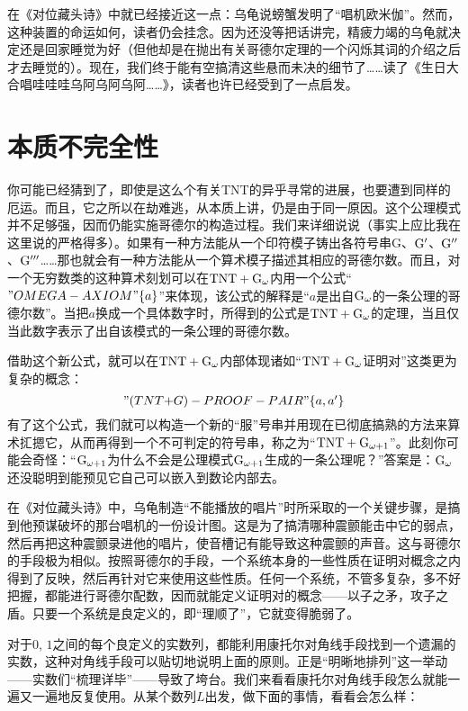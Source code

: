 在《对位藏头诗》中就已经接近这一点：乌龟说螃蟹发明了“唱机欧米伽”。然而，这种装置的命运如何，读者仍会挂念。因为还没等把话讲完，精疲力竭的乌龟就决定还是回家睡觉为好（但他却是在抛出有关哥德尔定理的一个闪烁其词的介绍之后才去睡觉的）。现在，我们终于能有空搞清这些悬而未决的细节了……读了《生日大合唱哇哇哇乌阿乌阿乌阿……》，读者也许已经受到了一点启发。

\section{本质不完全性}

你可能已经猜到了，即使是这么个有关TNT的异乎寻常的进展，也要遭到同样的厄运。而且，它之所以在劫难逃，从本质上讲，仍是由于同一原因。这个公理模式并不足够强，因而仍能实施哥德尔的构造过程。我们来详细说说（事实上应比我在这里说的严格得多）。如果有一种方法能从一个印符模子铸出各符号串G、$\mathrm { G }'$、$\mathrm { G }''$、$\mathrm { G }'''$……那也就会有一种方法能从一个算术模子描述其相应的哥德尔数。而且，对一个无穷数类的这种算术刻划可以在$\mathrm { TNT }+\mathrm { G }_\omega$内用一个公式“$"OMEGA-AXIOM"\{a\}$”来体现，该公式的解释是“$a$是出自$\mathrm { G }_\omega$的一条公理的哥德尔数”。当把$a$换成一个具体数字时，所得到的公式是$\mathrm { TNT }+\mathrm { G }_\omega$的定理，当且仅当此数字表示了出自该模式的一条公理的哥德尔数。

借助这个新公式，就可以在$\mathrm { TNT }+\mathrm { G }_\omega$内部体现诸如“$\mathrm { TNT }+\mathrm { G }_\omega$证明对”这类更为复杂的概念：
\[
"(TNT${}+{}$G)-PROOF-PAIR"\{a, a'\}
\]
有了这个公式，我们就可以构造一个新的“服”号串并用现在已彻底搞熟的方法来算术㧟摁它，从而再得到一个不可判定的符号串，称之为“$\mathrm { TNT }+\mathrm { G }_{\omega+1}$”。此刻你可能会奇怪：“$\mathrm { G }_{\omega+1}$为什么不会是公理模式$\mathrm { G }_{\omega+1}$生成的一条公理呢？”答案是：$\mathrm { G }_\omega$还没聪明到能预见它自己可以嵌入到数论内部去。

在《对位藏头诗》中，乌龟制造“不能播放的唱片”时所采取的一个关键步骤，是搞到他预谋破坏的那台唱机的一份设计图。这是为了搞清哪种震颤能击中它的弱点，然后再把这种震颤录进他的唱片，使音槽记有能导致这种震颤的声音。这与哥德尔的手段极为相似。按照哥德尔的手段，一个系统本身的一些性质在证明对概念之内得到了反映，然后再针对它来使用这些性质。任何一个系统，不管多复杂，多不好把握，都能进行哥德尔配数，因而就能定义证明对的概念——以子之矛，攻子之盾。只要一个系统是良定义的，即“理顺了”，它就变得脆弱了。

对于$0$, $1$之间的每个良定义的实数列，都能利用康托尔对角线手段找到一个遗漏的实数，这种对角线手段可以贴切地说明上面的原则。正是“明晰地排列”这一举动——实数们“梳理详毕”——导致了垮台。我们来看看康托尔对角线手段怎么就能一遍又一遍地反复使用。从某个数列$L$出发，做下面的事情，看看会怎么样：

